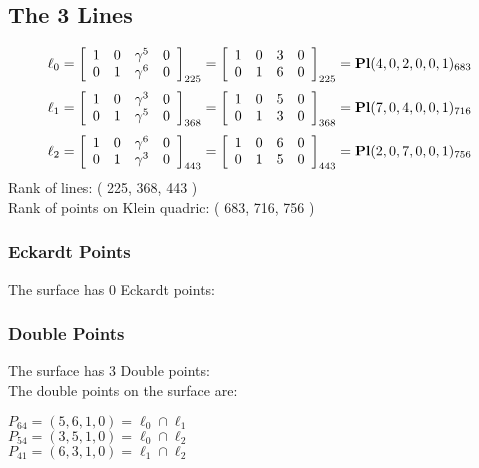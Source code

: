 \documentclass{article}
\begin{document}
{\subsection*{The 3 Lines}
$$
\ell_{0} = 
\left[
\begin{array}{*{4}{r}}
1 & 0 & \gamma^{5} & 0\\
0 & 1 & \gamma^{6} & 0\\
\end{array}
\right]
_{225}
=
\left[
\begin{array}{*{4}c}
1  & 0  & 3  & 0\\
0  & 1  & 6  & 0\\
\end{array}
\right]_{225}
={\rm\bf Pl}(4,0,2,0,0,1 )_{683}$$
$$
\ell_{1} = 
\left[
\begin{array}{*{4}{r}}
1 & 0 & \gamma^{3} & 0\\
0 & 1 & \gamma^{5} & 0\\
\end{array}
\right]
_{368}
=
\left[
\begin{array}{*{4}c}
1  & 0  & 5  & 0\\
0  & 1  & 3  & 0\\
\end{array}
\right]_{368}
={\rm\bf Pl}(7,0,4,0,0,1 )_{716}$$
$$
\ell_{2} = 
\left[
\begin{array}{*{4}{r}}
1 & 0 & \gamma^{6} & 0\\
0 & 1 & \gamma^{3} & 0\\
\end{array}
\right]
_{443}
=
\left[
\begin{array}{*{4}c}
1  & 0  & 6  & 0\\
0  & 1  & 5  & 0\\
\end{array}
\right]_{443}
={\rm\bf Pl}(2,0,7,0,0,1 )_{756}$$
Rank of lines: ( 225, 368, 443 )\\
Rank of points on Klein quadric: ( 683, 716, 756 )\\
\subsubsection*{Eckardt Points}
The surface has 0 Eckardt points:\\
\subsubsection*{Double Points}
The surface has 3 Double points:\\
The double points on the surface are:\\
\begin{multicols}{2}
\noindent
$P_{64} = ( 5, 6, 1, 0 ) = \ell_{0} \cap \ell_{1} $\\
$P_{54} = ( 3, 5, 1, 0 ) = \ell_{0} \cap \ell_{2} $\\
$P_{41} = ( 6, 3, 1, 0 ) = \ell_{1} \cap \ell_{2} $\\
\end{multicols}
}
\end{document}
